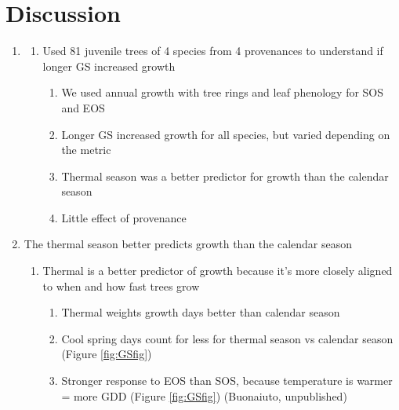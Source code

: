 \clearpage
\section*{Discussion}

\begin{enumerate}
\item 
  \begin{enumerate}
  \item Used 81 juvenile trees of 4 species from 4 provenances to understand if longer GS increased   growth 
    \begin{enumerate}
    \item We used annual growth with tree rings and leaf phenology for SOS and EOS
    
    \item Longer GS increased growth for all species, but varied depending on the metric 
    
    \item Thermal season was a better predictor for growth than the calendar season
    
    \item Little effect of provenance
    \end{enumerate}
  \end{enumerate}

\item The thermal season better predicts growth than the calendar season
  \begin{enumerate}
  \item Thermal is a better predictor of growth because it's more closely aligned to when and how fast trees grow
    \begin{enumerate}
    
    \item Thermal weights growth days better than calendar season
    
    \item Cool spring days count for less for thermal season vs calendar season (Figure \ref{fig:GSfig})
    
    \item Stronger response to EOS than SOS, because temperature is warmer = more GDD (Figure \ref{fig:GSfig}) (Buonaiuto, unpublished)
    

\end{enumerate}
\end{enumerate}
\end{enumerate}
